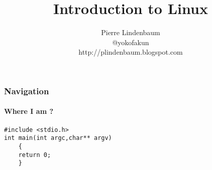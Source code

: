 \documentclass{beamer}
\title{Introduction to Linux}
\author{Pierre Lindenbaum\\@yokofakun\\http://plindenbaum.blogspot.com}\institute{Institut du Thorax. Nantes. France}
\begin{document}
\begin{frame}
\titlepage
\end{frame}


\begin{frame}[fragile]
\frametitle{Navigation}
\framesubtitle{Where I am ?}

\begin{lstlisting}
#include <stdio.h>
int main(int argc,char** argv)
	{
	return 0;
	}
\end{lstlisting}
\end{frame}
\end{document}
